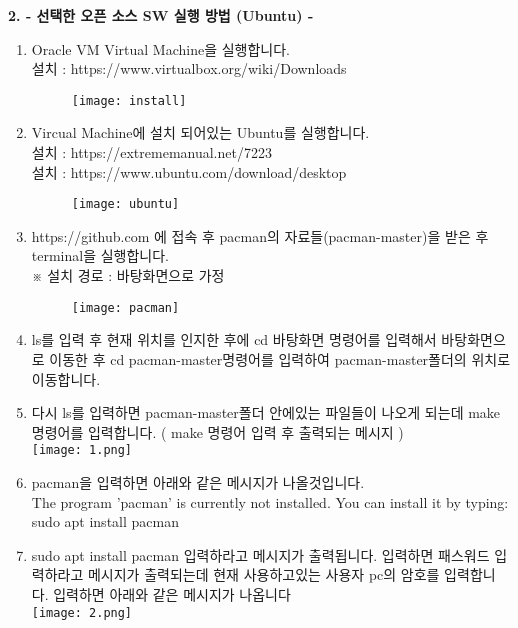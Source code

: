 \documentclass{article}
\begin{document}
 
\begin{large}\textbf{2. - 선택한 오픈 소스 SW 실행 방법 (Ubuntu) -}\end{large}
\begin{enumerate}
\item Oracle VM Virtual Machine을 실행합니다. \\

설치 : https://www.virtualbox.org/wiki/Downloads\\ 
 \begin{figure}[!h]
\centering
\texttt{[image: install]}
\end{figure}

\newpage

\item Vircual Machine에 설치 되어있는 Ubuntu를 실행합니다. \\
설치 : https://extrememanual.net/7223\\
설치 : https://www.ubuntu.com/download/desktop\\

 \begin{figure}[!h]
\centering
\texttt{[image: ubuntu]}
\end{figure}

\item https://github.com 에 접속 후 pacman의 자료들(pacman-master)을 받은 후 terminal을 실행합니다. \\※ 설치 경로 : 바탕화면으로 가정\\

 \begin{figure}[!h]
\centering
\texttt{[image: pacman]}
\end{figure}

\item ls를 입력 후 현재 위치를 인지한 후에 cd 바탕화면 명령어를 입력해서 바탕화면으로 이동한 후 cd pacman-master명령어를 입력하여 pacman-master폴더의 위치로 이동합니다.\\
\item 다시 ls를 입력하면 pacman-master폴더 안에있는 파일들이 나오게 되는데 make 명령어를 입력합니다. ( make 명령어 입력 후 출력되는 메시지 )\\
\texttt{[image: 1.png]}
\item pacman을 입력하면 아래와 같은 메시지가 나올것입니다. \\
The program 'pacman' is currently not installed. You can install it by typing: sudo apt install pacman\\
\item sudo apt install pacman 입력하라고 메시지가 출력됩니다. 입력하면 패스워드 입력하라고 메시지가 출력되는데 현재 사용하고있는 사용자 pc의 암호를 입력합니다. 입력하면 아래와 같은 메시지가 나옵니다\\
\texttt{[image: 2.png]}
\end{enumerate}
\end{document}

